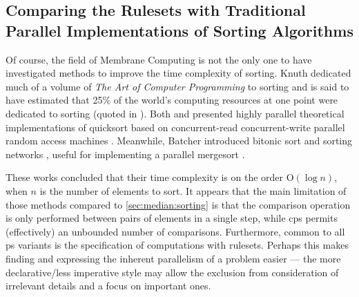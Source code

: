
\subsection{Comparing the  Rulesets with Traditional Parallel Implementations of Sorting Algorithms}

Of course, the field of Membrane Computing is not the only one to have investigated methods to improve the time complexity of sorting.  Knuth dedicated much of a volume of \textit{The Art of Computer Programming} to sorting \cite{Knuth1998} and is said to have estimated that 25\% of the world's computing resources at one point were dedicated to sorting (quoted in \cite{Powers1991}).  Both \citeauthor{Powers1991} \cite{Powers1991} and \citeauthor{Chlebus1991} \cite{Chlebus1991} presented highly parallel theoretical implementations of quicksort based on concurrent-read concurrent-write parallel random access machines \cite{JaJa2011}.  Meanwhile, Batcher introduced bitonic sort and sorting networks \cite{Akl2011}, useful for implementing a parallel mergesort \cite{Lee1995}.

These works concluded that their time complexity is on the order O\((\log n)\), when \(n\) is the number of elements to sort.  It appears that the main limitation of those methods compared to \cref{sec:median:sorting} is that the comparison operation is only performed between pairs of elements in a single step, while \gls{cps} permits (effectively) an unbounded number of comparisons.  Furthermore, common to all \gls{ps} variants is the specification of computations with \glspl{ruleset}.  Perhaps this makes finding and expressing the inherent parallelism of a problem easier --- the more declarative/less imperative style may allow the exclusion from consideration of irrelevant details and a focus on important ones.